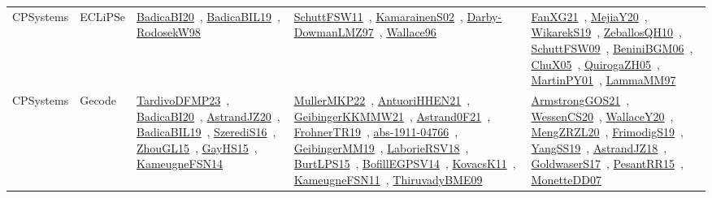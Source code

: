 {\begin{longtable}{lp{3cm}>{\raggedright\arraybackslash}p{6cm}>{\raggedright\arraybackslash}p{6cm}>{\raggedright\arraybackslash}p{8cm}}
CPSystems & ECLiPSe & \href{works/BadicaBI20.pdf}{BadicaBI20}~\cite{BadicaBI20}, \href{works/BadicaBIL19.pdf}{BadicaBIL19}~\cite{BadicaBIL19}, \href{works/RodosekW98.pdf}{RodosekW98}~\cite{RodosekW98} & \href{works/SchuttFSW11.pdf}{SchuttFSW11}~\cite{SchuttFSW11}, \href{works/KamarainenS02.pdf}{KamarainenS02}~\cite{KamarainenS02}, \href{works/Darby-DowmanLMZ97.pdf}{Darby-DowmanLMZ97}~\cite{Darby-DowmanLMZ97}, \href{works/Wallace96.pdf}{Wallace96}~\cite{Wallace96} & \href{works/FanXG21.pdf}{FanXG21}~\cite{FanXG21}, \href{works/MejiaY20.pdf}{MejiaY20}~\cite{MejiaY20}, \href{works/WikarekS19.pdf}{WikarekS19}~\cite{WikarekS19}, \href{works/ZeballosQH10.pdf}{ZeballosQH10}~\cite{ZeballosQH10}, \href{works/SchuttFSW09.pdf}{SchuttFSW09}~\cite{SchuttFSW09}, \href{works/BeniniBGM06.pdf}{BeniniBGM06}~\cite{BeniniBGM06}, \href{works/ChuX05.pdf}{ChuX05}~\cite{ChuX05}, \href{works/QuirogaZH05.pdf}{QuirogaZH05}~\cite{QuirogaZH05}, \href{works/MartinPY01.pdf}{MartinPY01}~\cite{MartinPY01}, \href{works/LammaMM97.pdf}{LammaMM97}~\cite{LammaMM97}\\
CPSystems & Gecode & \href{works/TardivoDFMP23.pdf}{TardivoDFMP23}~\cite{TardivoDFMP23}, \href{works/BadicaBI20.pdf}{BadicaBI20}~\cite{BadicaBI20}, \href{works/AstrandJZ20.pdf}{AstrandJZ20}~\cite{AstrandJZ20}, \href{works/BadicaBIL19.pdf}{BadicaBIL19}~\cite{BadicaBIL19}, \href{works/SzerediS16.pdf}{SzerediS16}~\cite{SzerediS16}, \href{works/ZhouGL15.pdf}{ZhouGL15}~\cite{ZhouGL15}, \href{works/GayHS15.pdf}{GayHS15}~\cite{GayHS15}, \href{works/KameugneFSN14.pdf}{KameugneFSN14}~\cite{KameugneFSN14} & \href{works/MullerMKP22.pdf}{MullerMKP22}~\cite{MullerMKP22}, \href{works/AntuoriHHEN21.pdf}{AntuoriHHEN21}~\cite{AntuoriHHEN21}, \href{works/GeibingerKKMMW21.pdf}{GeibingerKKMMW21}~\cite{GeibingerKKMMW21}, \href{works/Astrand0F21.pdf}{Astrand0F21}~\cite{Astrand0F21}, \href{works/FrohnerTR19.pdf}{FrohnerTR19}~\cite{FrohnerTR19}, \href{works/abs-1911-04766.pdf}{abs-1911-04766}~\cite{abs-1911-04766}, \href{works/GeibingerMM19.pdf}{GeibingerMM19}~\cite{GeibingerMM19}, \href{works/LaborieRSV18.pdf}{LaborieRSV18}~\cite{LaborieRSV18}, \href{works/BurtLPS15.pdf}{BurtLPS15}~\cite{BurtLPS15}, \href{works/BofillEGPSV14.pdf}{BofillEGPSV14}~\cite{BofillEGPSV14}, \href{works/KovacsK11.pdf}{KovacsK11}~\cite{KovacsK11}, \href{works/KameugneFSN11.pdf}{KameugneFSN11}~\cite{KameugneFSN11}, \href{works/ThiruvadyBME09.pdf}{ThiruvadyBME09}~\cite{ThiruvadyBME09} & \href{works/ArmstrongGOS21.pdf}{ArmstrongGOS21}~\cite{ArmstrongGOS21}, \href{works/WessenCS20.pdf}{WessenCS20}~\cite{WessenCS20}, \href{works/WallaceY20.pdf}{WallaceY20}~\cite{WallaceY20}, \href{works/MengZRZL20.pdf}{MengZRZL20}~\cite{MengZRZL20}, \href{works/FrimodigS19.pdf}{FrimodigS19}~\cite{FrimodigS19}, \href{works/YangSS19.pdf}{YangSS19}~\cite{YangSS19}, \href{works/AstrandJZ18.pdf}{AstrandJZ18}~\cite{AstrandJZ18}, \href{works/GoldwaserS17.pdf}{GoldwaserS17}~\cite{GoldwaserS17}, \href{works/PesantRR15.pdf}{PesantRR15}~\cite{PesantRR15}, \href{works/MonetteDD07.pdf}{MonetteDD07}~\cite{MonetteDD07}\\

\end{longtable}}
